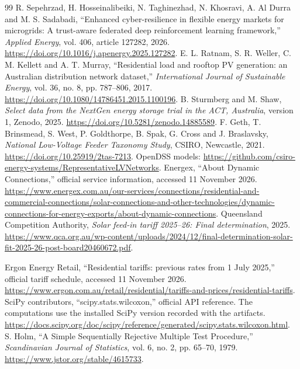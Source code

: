 \documentclass[preprint,12pt,a4paper]{elsarticle}
\begin{document}
\begin{thebibliography}{99}
 R. Sepehrzad, H. Hosseinalibeiki, N. Taghinezhad, N. Khosravi, A. Al Durra and M. S. Sadabadi, ``Enhanced cyber-resilience in flexible energy markets for microgrids: A trust-aware federated deep reinforcement learning framework,'' \emph{Applied Energy}, vol. 406, article 127282, 2026. \url{https://doi.org/10.1016/j.apenergy.2025.127282}.
 E. L. Ratnam, S. R. Weller, C. M. Kellett and A. T. Murray, ``Residential load and rooftop PV generation: an Australian distribution network dataset,'' \emph{International Journal of Sustainable Energy}, vol. 36, no. 8, pp. 787--806, 2017. \url{https://doi.org/10.1080/14786451.2015.1100196}.
 B. Sturmberg and M. Shaw, \emph{Select data from the NextGen energy storage trial in the ACT, Australia}, version 1, Zenodo, 2025. \url{https://doi.org/10.5281/zenodo.14885589}.
 F. Geth, T. Brinsmead, S. West, P. Goldthorpe, B. Spak, G. Cross and J. Braslavsky, \emph{National Low-Voltage Feeder Taxonomy Study}, CSIRO, Newcastle, 2021. \url{https://doi.org/10.25919/2tas-7213}. OpenDSS models: \url{https://github.com/csiro-energy-systems/RepresentativeLVNetworks}.
 Energex, ``About Dynamic Connections,'' official service information, accessed 11 November 2026. \url{https://www.energex.com.au/our-services/connections/residential-and-commercial-connections/solar-connections-and-other-technologies/dynamic-connections-for-energy-exports/about-dynamic-connections}.
 Queensland Competition Authority, \emph{Solar feed-in tariff 2025--26: Final determination}, 2025. \url{https://www.qca.org.au/wp-content/uploads/2024/12/final-determination-solar-fit-2025-26-post-board20460672.pdf}.

 Ergon Energy Retail, ``Residential tariffs: previous rates from 1 July 2025,'' official tariff schedule, accessed 11 November 2026. \url{https://www.ergon.com.au/retail/residential/tariffs-and-prices/residential-tariffs}.
 SciPy contributors, ``scipy.stats.wilcoxon,'' official API reference. The computations use the installed SciPy version recorded with the artifacts. \url{https://docs.scipy.org/doc/scipy/reference/generated/scipy.stats.wilcoxon.html}.
 S. Holm, ``A Simple Sequentially Rejective Multiple Test Procedure,'' \emph{Scandinavian Journal of Statistics}, vol. 6, no. 2, pp. 65--70, 1979. \url{https://www.jstor.org/stable/4615733}.
\end{thebibliography}

\end{document}
